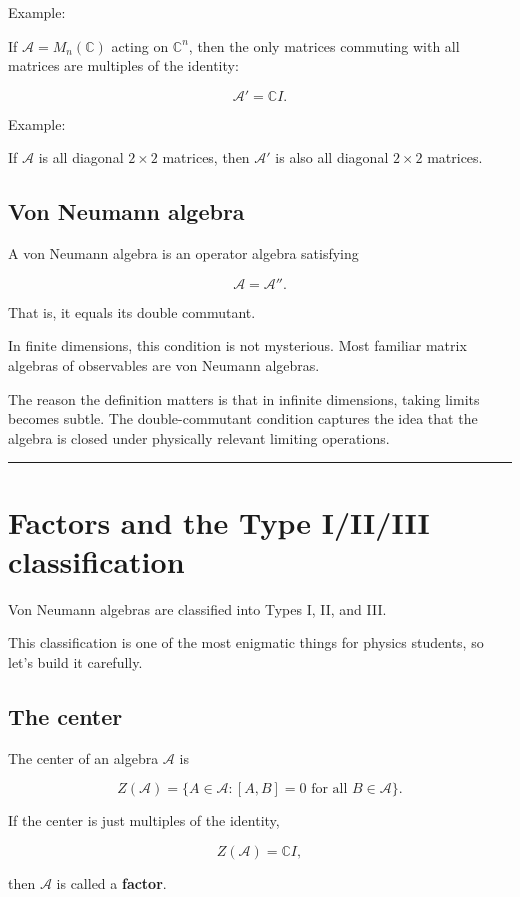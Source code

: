 \documentclass[11pt,a4paper]{article}
\begin{document}
Example:

If $\mathcal{A}=M_n(\mathbb{C})$ acting on $\mathbb{C}^n$, then the only matrices commuting with all matrices are multiples of the identity:

\[
\mathcal{A}'=\mathbb{C}I.
\]

Example:

If $\mathcal{A}$ is all diagonal $2\times 2$ matrices, then $\mathcal{A}'$ is also all diagonal $2\times 2$ matrices.

\subsection{Von Neumann algebra}

A von Neumann algebra is an operator algebra satisfying

\[
\mathcal{A}=\mathcal{A}''.
\]

That is, it equals its double commutant.

In finite dimensions, this condition is not mysterious. Most familiar matrix algebras of observables are von Neumann algebras.

The reason the definition matters is that in infinite dimensions, taking limits becomes subtle. The double-commutant condition captures the idea that the algebra is closed under physically relevant limiting operations.

\medskip\hrule\medskip

\section{Factors and the Type I/II/III classification}

Von Neumann algebras are classified into Types I, II, and III.

This classification is one of the most enigmatic things for physics students, so let’s build it carefully.

\subsection{The center}

The center of an algebra $\mathcal{A}$ is

\[
Z(\mathcal{A})=\{A\in\mathcal{A}:[A,B]=0\text{ for all }B\in\mathcal{A}\}.
\]

If the center is just multiples of the identity,

\[
Z(\mathcal{A})=\mathbb{C}I,
\]

then $\mathcal{A}$ is called a \textbf{factor}.
\end{document}
